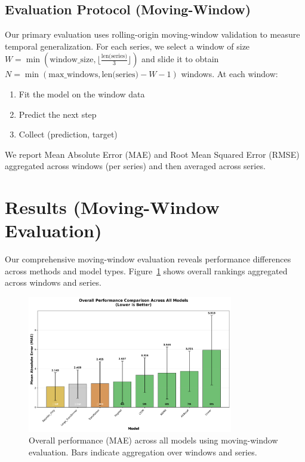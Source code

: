 \documentclass[11pt]{article}
\begin{document}
\subsection{Evaluation Protocol (Moving-Window)}

Our primary evaluation uses rolling-origin moving-window validation to measure temporal generalization. For each series, we select a window of size $W = \min(\text{window\_size}, \lfloor \frac{\text{len(series)}}{3} \rfloor)$ and slide it to obtain $N = \min(\text{max\_windows}, \text{len(series)} - W - 1)$ windows. At each window:
\begin{enumerate}
    \item Fit the model on the window data
    \item Predict the next step
    \item Collect (prediction, target)
\end{enumerate}
We report Mean Absolute Error (MAE) and Root Mean Squared Error (RMSE) aggregated across windows (per series) and then averaged across series.

\section{Results (Moving-Window Evaluation)}

Our comprehensive moving-window evaluation reveals performance differences across methods and model types. Figure~\ref{fig:overall_performance} shows overall rankings aggregated across windows and series.

\begin{figure}[h]
\centering
\includegraphics[width=0.8\textwidth]{../results/figure1_overall_performance.png}
\caption{Overall performance (MAE) across all models using moving-window evaluation. Bars indicate aggregation over windows and series.}
\label{fig:overall_performance}
\end{figure}
\end{document}
